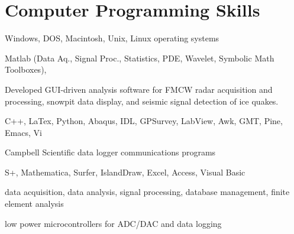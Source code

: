 \documentclass[11pt]{article}
\renewenvironment{itemize}{
  \begin{list}{}{
    \setlength{\leftmargin}{1.5em}
    \setlength{\itemsep}{0pt}
    \setlength{\parskip}{0pt}
  }
}{
  \end{list}
}
\begin{document}
\section*{Computer Programming Skills}
\begin{itemize}
\item Windows, DOS, Macintosh, Unix, Linux operating systems
\item Matlab (Data Aq., Signal Proc., Statistics, PDE, Wavelet, Symbolic Math Toolboxes),
\item Developed GUI-driven analysis software for FMCW radar acquisition and processing, snowpit data
   display, and seismic signal detection of ice quakes.
\item C++, LaTex, Python, Abaqus, IDL, GPSurvey, LabView, Awk, GMT, Pine, Emacs, Vi
\item Campbell Scientific data logger communications programs
\item S+, Mathematica, Surfer, IslandDraw, Excel, Access, Visual Basic
\item data acquisition, data analysis, signal processing, database management, finite element analysis
\item low power microcontrollers for ADC/DAC and data logging
\end{itemize}
\end{document}
